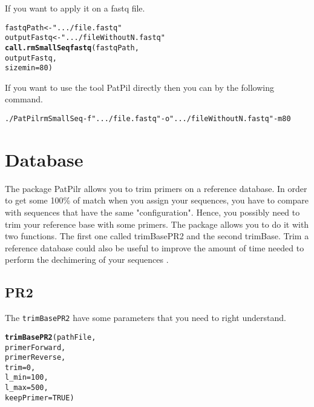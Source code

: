 \documentclass{article}\usepackage[]{graphicx}\usepackage[]{color}
\makeatletter
\newcommand{\hlnum}[1]{\textcolor[rgb]{0.686,0.059,0.569}{#1}}%
\newcommand{\hlstr}[1]{\textcolor[rgb]{0.192,0.494,0.8}{#1}}%
\newcommand{\hlstd}[1]{\textcolor[rgb]{0.345,0.345,0.345}{#1}}%
\newcommand{\hlkwb}[1]{\textcolor[rgb]{0.69,0.353,0.396}{#1}}%
\newcommand{\hlkwc}[1]{\textcolor[rgb]{0.333,0.667,0.333}{#1}}%
\newcommand{\hlkwd}[1]{\textcolor[rgb]{0.737,0.353,0.396}{\textbf{#1}}}%
\newenvironment{kframe}{%
 \def\at@end@of@kframe{}%
 \ifinner\ifhmode%
  \def\at@end@of@kframe{\end{minipage}}%
  \begin{minipage}{\columnwidth}%
 \fi\fi%
 \def\FrameCommand##1{\hskip\@totalleftmargin \hskip-\fboxsep
 \colorbox{shadecolor}{##1}\hskip-\fboxsep
     \hskip-\linewidth \hskip-\@totalleftmargin \hskip\columnwidth}%
 \MakeFramed {\advance\hsize-\width
   \@totalleftmargin\z@ \linewidth\hsize
   \@setminipage}}%
 {\par\unskip\endMakeFramed%
 \at@end@of@kframe}
\newenvironment{knitrout}{}{} %
\makeatother
\begin{document}
If you want to apply it on a fastq file.

\begin{knitrout}
\color{fgcolor}\begin{kframe}
\begin{alltt}
\hlstd{fastqPath} \hlkwb{<-} \hlstr{".../file.fastq"}
\hlstd{outputFastq} \hlkwb{<-} \hlstr{".../fileWithoutN.fastq"}
\hlkwd{call.rmSmallSeqfastq}\hlstd{(fastqPath,}
        \hlstd{outputFastq,}
        \hlkwc{sizemin} \hlstd{=} \hlnum{80}\hlstd{)}
\end{alltt}
\end{kframe}
\end{knitrout}
If you want to use the tool PatPil directly then you can by the following command.
\begin{knitrout}
\color{fgcolor}\begin{kframe}
\begin{alltt}
./PatPil rmSmallSeq -f \hlstr{".../file.fastq"} -o \hlstr{".../fileWithoutN.fastq"} -m 80
\end{alltt}
\end{kframe}
\end{knitrout}

\newpage
\section{Database}
The package PatPilr allows you to trim primers on a reference database. In order to get some 100\% of match when you assign your sequences, you have to compare with sequences that have the same "configuration". Hence, you possibly need to trim your reference base with some primers. The package allows you to do it with two functions. The first one called trimBasePR2 \cite{doi:10.1093/nar/gks1160} and the second trimBase. Trim a reference database could also be useful to improve the amount of time needed to perform the dechimering of your sequences \cite{Edgar074252}.


\subsection{PR2}

The \texttt{trimBasePR2} have some parameters that you need to right understand.
\begin{knitrout}
\color{fgcolor}\begin{kframe}
\begin{alltt}
\hlkwd{trimBasePR2}\hlstd{(pathFile,}
        \hlstd{primerForward,}
        \hlstd{primerReverse,}
        \hlkwc{trim} \hlstd{=} \hlnum{0}\hlstd{,}
        \hlkwc{l_min} \hlstd{=} \hlnum{100}\hlstd{,}
        \hlkwc{l_max} \hlstd{=} \hlnum{500}\hlstd{,}
        \hlkwc{keepPrimer} \hlstd{=} \hlnum{TRUE}\hlstd{)}
\end{alltt}
\end{kframe}
\end{knitrout}
\end{document}
